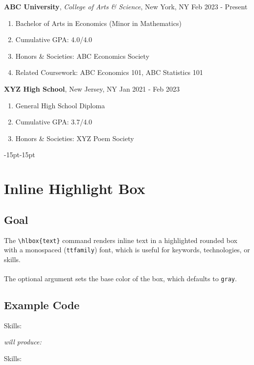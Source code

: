 \documentclass[a4paper, 10pt]{article}
\begin{document}
\begin{ressection}[title = Education]
    {\bf ABC University}, {\sl College of Arts \& Science}, New York, NY
    \hfill
    Feb 2023 - Present

    \begin{enumerate}
        \item Bachelor of Arts in Economics (Minor in Mathematics)
        \item Cumulative GPA: 4.0/4.0
        \item Honors \& Societies: ABC Economics Society
        \item Related Coursework: ABC Economics 101, ABC Statistics 101
    \end{enumerate}

    \ressep

    {\bf XYZ High School}, New Jersey, NY
    \hfill
    Jan 2021 - Feb 2023

    \begin{enumerate}
        \item General High School Diploma
        \item Cumulative GPA: 3.7/4.0
        \item Honors \& Societies: XYZ Poem Society
    \end{enumerate}
\end{ressection}

\vspace{-6cm}

\begin{adjustwidth}{-15pt}{-15pt}
    \begin{tcolorbox}[standard jigsaw, opacityback = 0.1, colback = gray, boxrule = 0.5pt]
        \vspace{5cm}
    \end{tcolorbox}
\end{adjustwidth}

\newpage

\section{Inline Highlight Box}

\subsection{Goal}
The \verb+\hlbox{text}+ command renders inline text in a highlighted rounded box
with a monospaced ({\tt ttfamily}) font, which is useful for keywords,
technologies, or skills.\\
~\\
The optional argument sets the base color of the box, which defaults to
{\tt gray}.

\subsection{Example Code}
\begin{codebox}[title = Inline Highlight Box Example Code]
    Skills:  \hlbox[blue]{\LaTeX} 
\end{codebox}

\vspace{1cm}

{\it will produce:}

\vspace{1cm}

Skills:  \hlbox[blue]{\LaTeX} 
\end{document}
